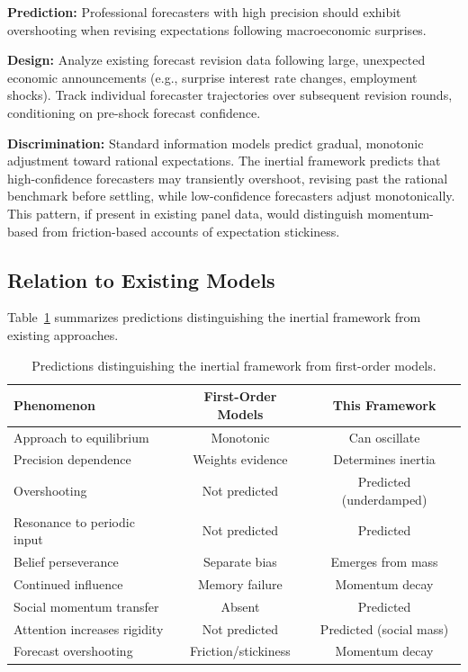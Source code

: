 \documentclass[12pt]{article}
\begin{document}
\textbf{Prediction:} Professional forecasters with high precision should exhibit overshooting when revising expectations following macroeconomic surprises.


\textbf{Design:} Analyze existing forecast revision data \citet{coibion2015} following large, unexpected economic announcements (e.g., surprise interest rate changes, employment shocks). Track individual forecaster trajectories over subsequent revision rounds, conditioning on pre-shock forecast confidence.

 
\textbf{Discrimination:} Standard information models predict gradual, monotonic adjustment toward rational expectations. The inertial framework predicts that high-confidence forecasters may transiently overshoot, revising past the rational benchmark before settling, while low-confidence forecasters adjust monotonically. This pattern, if present in existing panel data, would distinguish momentum-based from friction-based accounts of expectation stickiness.


\subsection{Relation to Existing Models}

Table~\ref{tab:model_comparison} summarizes predictions distinguishing the inertial framework from existing approaches.

\begin{table}[ht]
\centering
\caption{Predictions distinguishing the inertial framework from first-order models.}
\label{tab:model_comparison}
\begin{tabular}{lcc}
\hline
\textbf{Phenomenon} & \textbf{First-Order Models} & \textbf{This Framework} \\
\hline
Approach to equilibrium & Monotonic & Can oscillate \\
Precision dependence & Weights evidence & Determines inertia \\
Overshooting & Not predicted & Predicted (underdamped) \\
Resonance to periodic input & Not predicted & Predicted \\
Belief perseverance & Separate bias & Emerges from mass \\
Continued influence & Memory failure & Momentum decay \\
Social momentum transfer & Absent & Predicted \\
Attention increases rigidity & Not predicted & Predicted (social mass) \\
Forecast overshooting & Friction/stickiness & Momentum decay \\
\hline
\end{tabular}
\end{table}
\end{document}
